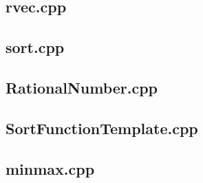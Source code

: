     \subsection{rvec.cpp}
        
    \subsection{sort.cpp}
        
    \subsection{RationalNumber.cpp}
            
    \subsection{SortFunctionTemplate.cpp}
        
    \subsection{minmax.cpp}
        